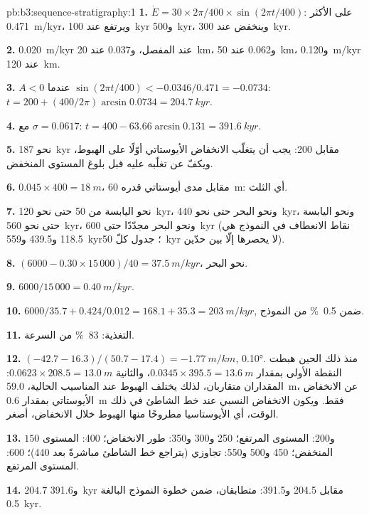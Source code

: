 \begin{solution}{pb:b3:sequence-stratigraphy:1}
\textbf{1.} $\dot E = 30\times2\pi/400\times\sin(2\pi t/400)$: على الأكثر
\qty{0.471}{m/kyr}، ويرتفع عند \qty{100}{kyr} و\qty{500}{kyr}، وينخفض عند
\qty{300}{kyr}.

\textbf{2.} \qty{0.020}{m/kyr} عند المفصل، و0.037 عند \qty{20}{km}، و0.062 عند
\qty{50}{km}، و\qty{0.120}{m/kyr} عند \qty{120}{km}.

\textbf{3.} $A < 0$ عندما $\sin(2\pi t/400) < -0.0346/0.471 = -0.0734$: $t =
200 + (400/2\pi)\arcsin0.0734 = \qty{204.7}{kyr}$.

\textbf{4.} مع $\sigma = 0.0617$: $t = 400 - 63.66\arcsin0.131 =
\qty{391.6}{kyr}$.

\textbf{5.} نحو \qty{187}{kyr} مقابل 200: يجب أن يتغلّب الانخفاض الأيوستاتي أوّلًا
على الهبوط، ويكفّ عن تغلّبه عليه قبل بلوغ المستوى المنخفض.

\textbf{6.} $0.045\times400 = \qty{18}{m}$، مقابل مدى أيوستاتي قدره
\qty{60}{m}: أي الثلث.

\textbf{7.} نحو اليابسة من 50 حتى نحو \qty{120}{kyr}، ونحو البحر حتى نحو
\qty{440}{kyr}، ونحو اليابسة حتى نحو \qty{560}{kyr}، ونحو البحر مجدّدًا حتى
\qty{600}{kyr} (نقاط الانعطاف في النموذج هي 118.5 و439.5
و\qty{559}{kyr}؛ جدول كلّ \qty{50}{kyr} لا يحصرها إلّا بين حدّين).

\textbf{8.} $(6000 - 0.30\times15\,000)/40 = \qty{37.5}{m/kyr}$، نحو البحر.

\textbf{9.} $6000/15\,000 = \qty{0.40}{m/kyr}$.

\textbf{10.} $6000/35.7 + 0.424/0.012 = 168.1 + 35.3 = \qty{203}{m/kyr}$,
ضمن \qty{0.5}{\percent} من النموذج.

\textbf{11.} التغذية: \qty{83}{\percent} من السرعة.

\textbf{12.} $(-42.7 - 16.3)/(50.7 - 17.4) = \qty{-1.77}{m/km}$, \ang{0.10}.
منذ ذلك الحين هبطت النقطة الأولى بمقدار $0.0345\times395.5 =
\qty{13.6}{m}$، والثانية $0.0623\times208.5 = \qty{13.0}{m}$: المقداران متقاربان،
لذلك يختلف الهبوط عند المناسيب الحالية، \qty{59.0}{m}، عن الانخفاض الأيوستاتي
بمقدار \qty{0.6}{m} فقط. ويكون الانخفاض النسبي عند خط الشاطئ في ذلك الوقت،
أي الأيوستاسيا مطروحًا منها الهبوط خلال الانخفاض، أصغر.

\textbf{13.} $150$ و200: المستوى المرتفع؛ 250 و300 و350: طور الانخفاض؛ 400:
المستوى المنخفض؛ 450 و500 و550: تجاوزي (يتراجع خط الشاطئ مباشرةً بعد
440)؛ 600: المستوى المرتفع.

\textbf{14.} $204.7$ و\qty{391.6}{kyr} مقابل 204.5 و391.5: متطابقان،
ضمن خطوة النموذج البالغة \qty{0.5}{kyr}.


\end{solution}
